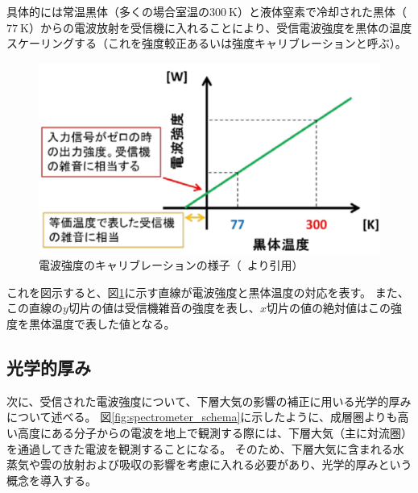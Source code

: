 具体的には常温黒体（多くの場合室温の$300\ \mathrm{K}$）と液体窒素で冷却された黒体（$77\ \mathrm{K}$）からの電波放射を受信機に入れることにより、受信電波強度を黒体の温度スケーリングする（これを強度較正あるいは強度キャリブレーションと呼ぶ）。
\begin{figure}[htbp]
    \centering
    \includegraphics[scale=0.6]{master_thesis_contents/master_thesis_fig/calibration.pdf}
    \caption{電波強度のキャリブレーションの様子（~\cite{ito2017master}より引用）}
    \label{fig:calibration}
\end{figure}
これを図示すると、図\ref{fig:calibration}に示す直線が電波強度と黒体温度の対応を表す。
また、この直線の$y$切片の値は受信機雑音の強度を表し、$x$切片の値の絶対値はこの強度を黒体温度で表した値となる。


\subsection{光学的厚み}
\label{ssec:obs_opticaldepth}
次に、受信された電波強度について、下層大気の影響の補正に用いる光学的厚みについて述べる。
図\ref{fig:spectrometer_schema}に示したように、成層圏よりも高い高度にある分子からの電波を地上で観測する際には、下層大気（主に対流圏）を通過してきた電波を観測することになる。
そのため、下層大気に含まれる水蒸気や雲の放射および吸収の影響を考慮に入れる必要があり、光学的厚みという概念を導入する。\par

